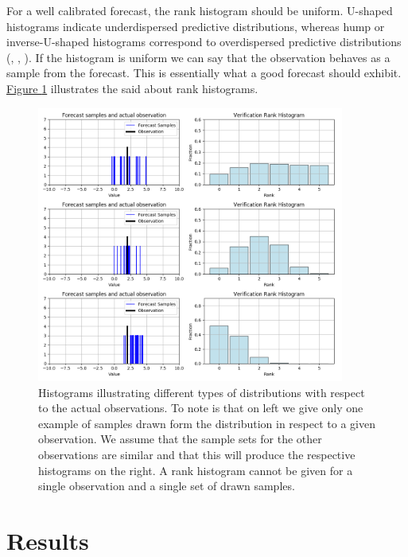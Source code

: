 \documentclass[12pt,a4paper,twoside]{scrartcl}
\numberwithin{equation}{section}
\newcommand{\reffig}[1]{\hyperref[#1]{Figure \ref*{#1}}}
\begin{document}
For a well calibrated forecast, the rank histogram should be uniform. U-shaped histograms indicate underdispersed predictive distributions, whereas hump or inverse-U-shaped histograms correspond to overdispersed predictive distributions (\cite{gneiting2014}, \cite{diebold1998}, \cite{hamill2001}). If the histogram is uniform we can say that the observation behaves as a sample from the forecast. This is essentially what a good forecast should exhibit. \reffig{fig:rank-hist} illustrates the said about rank histograms.
\begin{center}
  \begin{figure}[H]
    \centering
    \includegraphics[height=0.75\textwidth, width=0.9\textwidth]{figures/verification_histogram.png}
    \caption[Rank Histogram Example]{Histograms illustrating different types of distributions with respect to the actual observations. To note is that on left we give only one example of samples drawn form the distribution in respect to a given observation. We assume that the sample sets for the other observations are similar and that this will produce the respective histograms on the right. A rank histogram cannot be given for a single observation and a single set of drawn samples.}\label{fig:rank-hist}
  \end{figure}
\end{center}
\section{Results}\label{sec:res}
\end{document}
